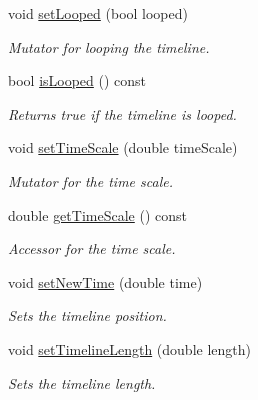 \begin{DoxyCompactItemize}
void \mbox{\hyperlink{class_arcana_1_1_timeline_ab9fb7b10c29cfda510feb40816be971c}{set\+Looped}} (bool looped)
\begin{DoxyCompactList}\small\item\em Mutator for looping the timeline. \end{DoxyCompactList}\item 
\mbox{\label{class_arcana_1_1_timeline_a0acc5055bd1a822e2bc34ecb36f4466c}} 
bool \mbox{\hyperlink{class_arcana_1_1_timeline_a0acc5055bd1a822e2bc34ecb36f4466c}{is\+Looped}} () const
\begin{DoxyCompactList}\small\item\em Returns true if the timeline is looped. \end{DoxyCompactList}\item 
void \mbox{\hyperlink{class_arcana_1_1_timeline_aec6c9fdd12143c467202658b39fb62e8}{set\+Time\+Scale}} (double time\+Scale)
\begin{DoxyCompactList}\small\item\em Mutator for the time scale. \end{DoxyCompactList}\item 
\mbox{\label{class_arcana_1_1_timeline_a623bcd9e19e42f2e066431dfc9b37729}} 
double \mbox{\hyperlink{class_arcana_1_1_timeline_a623bcd9e19e42f2e066431dfc9b37729}{get\+Time\+Scale}} () const
\begin{DoxyCompactList}\small\item\em Accessor for the time scale. \end{DoxyCompactList}\item 
void \mbox{\hyperlink{class_arcana_1_1_timeline_a54c3355a9f97c5173a3b7b0bb5146647}{set\+New\+Time}} (double time)
\begin{DoxyCompactList}\small\item\em Sets the timeline position. \end{DoxyCompactList}\item 
\mbox{\label{class_arcana_1_1_timeline_a95c061f715dcfe16c4f3fbe944f01f67}} 
void \mbox{\hyperlink{class_arcana_1_1_timeline_a95c061f715dcfe16c4f3fbe944f01f67}{set\+Timeline\+Length}} (double length)
\begin{DoxyCompactList}\small\item\em Sets the timeline length. \end{DoxyCompactList}\item 

\end{DoxyCompactItemize}
